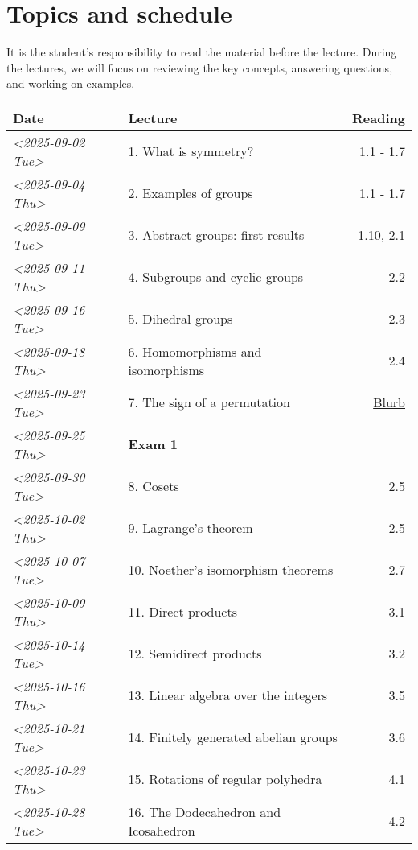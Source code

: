 \documentclass[11pt]{article}
\begin{document}
\section{Topics and schedule}
\label{sec:orgbbef39e}
It is the student's responsibility to read the material before the lecture.
During the lectures, we will focus on reviewing the key concepts, answering
questions, and working on examples.


\begin{center}
\begin{tabular}{l|l|r}
\hline
Date & Lecture & Reading\\[0pt]
\hline
\textit{<2025-09-02 Tue>} & 1. What is symmetry? & 1.1 - 1.7\\[0pt]
\textit{<2025-09-04 Thu>} & 2. Examples of groups & 1.1 - 1.7\\[0pt]
\textit{<2025-09-09 Tue>} & 3. Abstract groups: first results & 1.10, 2.1\\[0pt]
\textit{<2025-09-11 Thu>} & 4. Subgroups and cyclic groups & 2.2\\[0pt]
\textit{<2025-09-16 Tue>} & 5. Dihedral groups & 2.3\\[0pt]
\textit{<2025-09-18 Thu>} & 6. Homomorphisms and isomorphisms & 2.4\\[0pt]
\textit{<2025-09-23 Tue>} & 7. The sign of a permutation & \href{https://kconrad.math.uconn.edu/blurbs/grouptheory/sign.pdf}{Blurb}\\[0pt]
\textit{<2025-09-25 Thu>} & \textbf{Exam 1} & \\[0pt]
\textit{<2025-09-30 Tue>} & 8. Cosets & 2.5\\[0pt]
\textit{<2025-10-02 Thu>} & 9. Lagrange's theorem & 2.5\\[0pt]
\textit{<2025-10-07 Tue>} & 10. \href{https://en.wikipedia.org/wiki/Emmy\_Noether}{Noether's} isomorphism theorems & 2.7\\[0pt]
\textit{<2025-10-09 Thu>} & 11. Direct products & 3.1\\[0pt]
\textit{<2025-10-14 Tue>} & 12. Semidirect products & 3.2\\[0pt]
\textit{<2025-10-16 Thu>} & 13. Linear algebra over the integers & 3.5\\[0pt]
\textit{<2025-10-21 Tue>} & 14. Finitely generated abelian groups & 3.6\\[0pt]
\textit{<2025-10-23 Thu>} & 15. Rotations of regular polyhedra & 4.1\\[0pt]
\textit{<2025-10-28 Tue>} & 16. The Dodecahedron and Icosahedron & 4.2\\[0pt]

\end{tabular}
\end{center}
\end{document}

